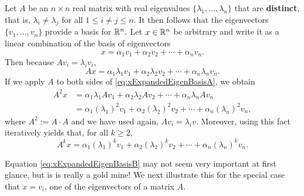 \vspace*{.2cm}
\begin{tcolorbox}[sharp corners, colback=green!30, colframe=green!80!blue, title=\textcolor{red}{\Large \bf Eigenvalues and Eigenvectors Explain how a Square Matrix acts on a Vector}]
Let $A$ be an $n \times n$ real matrix with real eigenvalues $\{ \lambda_1,\ldots, \lambda_n \}$ that are \textbf{distinct}, that is, $\lambda_i \neq \lambda_j $ for all $1 \le i \neq j \le n$. It then follows that the eigenvectors $\{ v_1,\ldots,v_n \}$ provide a basis for $\mathbb R^n.$ Let $x\in \mathbb R^n$ be arbitrary and write it as a linear combination of the basis of eigenvectors
\begin{equation}
    \label{eq:xExpandedEigenBasis}
    x = \alpha_ 1 v_1 + \alpha_2 v_2 + \cdots + \alpha_n v_n.
\end{equation}
Then because $Av_i = \lambda_i v_i$,
\begin{equation}
    \label{eq:xExpandedEigenBasisA}
   A x = \alpha_ 1 \lambda_1 v_1 + \alpha_2 \lambda_2 v_2 + \cdots +\alpha_n  \lambda_n v_n.
\end{equation}
If we apply $A$ to both sides of \eqref{eq:xExpandedEigenBasisA}, we obtain
\begin{equation}
    \label{eq:xExpandedEigenBasisA2}
    \begin{aligned}
       A^2 x &= \alpha_ 1 \lambda_1 A v_1 + \alpha_2 \lambda_2 A v_2 + \cdots +\alpha_n  \lambda_n Av_n \\
       &= \alpha_ 1 (\lambda_1)^2 v_1 + \alpha_2 (\lambda_2)^2  v_2 + \cdots +\alpha_n  (\lambda_n)^2 v_n,
    \end{aligned}
\end{equation}
where $A^2:= A \cdot A$ and we have used again, $A v_i = \lambda_i v$. 
Moreover, using this fact iteratively yields that, for all $k \ge 2$,
\begin{equation}
    \label{eq:xExpandedEigenBasisB}
   A^k x = \alpha_ 1 (\lambda_1)^k v_1 + \alpha_2 (\lambda_2)^k v_2 + \cdots +\alpha_n  (\lambda_n)^k v_n.
\end{equation}

\end{tcolorbox}
\vspace*{.2cm}

Equation \eqref{eq:xExpandedEigenBasisB} may not seem very important at first glance, but is is really a gold mine! We next illustrate this for the special case that $x = v_i$, one of the eigenvectors of a matrix $A$.\\

